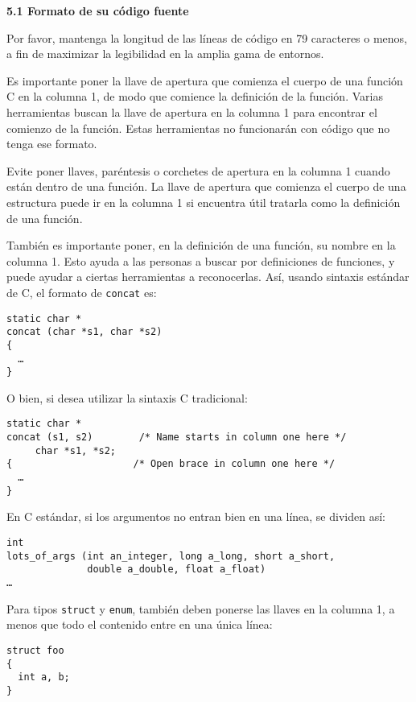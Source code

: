 \textbf{5.1 Formato de su código fuente}

Por favor, mantenga la longitud de las líneas de código en 79 caracteres o menos, a fin de maximizar la legibilidad en la amplia gama de entornos.

Es importante poner la llave de apertura que comienza el cuerpo de una función C en la columna 1, de modo que comience la definición de la función. Varias herramientas buscan la llave de apertura en la columna 1 para encontrar el comienzo de la función. Estas herramientas no funcionarán con código que no tenga ese formato.

Evite poner llaves, paréntesis o corchetes de apertura en la columna 1 cuando están dentro de una función. La llave de apertura que comienza el cuerpo de una estructura puede ir en la columna 1 si encuentra útil tratarla como la definición de una función.

También es importante poner, en la definición de una función, su nombre en la columna 1. Esto ayuda a las personas a buscar por definiciones de funciones, y puede ayudar a ciertas herramientas a reconocerlas. Así, usando sintaxis estándar de C, el formato de \texttt{concat} es:

\begin{verbatim}
static char *
concat (char *s1, char *s2)
{
  …
}
\end{verbatim}

O bien, si desea utilizar la sintaxis C tradicional:

\begin{verbatim}
static char *
concat (s1, s2)        /* Name starts in column one here */
     char *s1, *s2;
{                     /* Open brace in column one here */
  …
}
\end{verbatim}

En C estándar, si los argumentos no entran bien en una línea, se dividen así:

\begin{verbatim}
int
lots_of_args (int an_integer, long a_long, short a_short,
              double a_double, float a_float)
…
\end{verbatim}

Para tipos \texttt{struct} y \texttt{enum}, también deben ponerse las llaves en la columna 1, a menos que todo el contenido entre en una única línea:

\begin{verbatim}
struct foo
{
  int a, b;
}
\end{verbatim}

